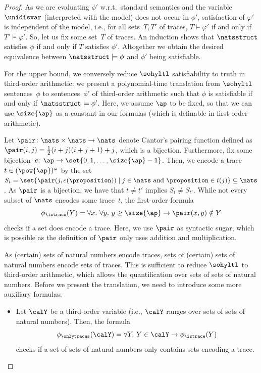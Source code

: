 \begin{proof}
As we are evaluating $\phi'$ w.r.t.\ standard semantics and the variable~$\unidisvar$ (interpreted with the model) does not occur in $\phi'$, satisfaction of $\varphi'$ is independent of the model, i.e., for all sets~$T,T'$ of traces, $T \models \varphi'$ if and only if $T' \models \varphi'$.
So, let us fix some set~$T$ of traces.
An induction shows that $\natsstruct$ satisfies $\phi$ if and only if $T$ satisfies $\phi'$.
Altogether we obtain the desired equivalence between $\natsstruct \models \phi$ and $\phi'$ being satisfiable.

For the upper bound, we conversely reduce $\sohyltl$ satisfiability to truth in third-order arithmetic: we present a polynomial-time translation from $\sohyltl$ sentences~$\phi$ 
 to sentences~$\phi'$ of third-order arithmetic such that  $\phi$ is satisfiable if and only if  $\natsstruct \models \phi'$. Here, we assume $\ap$ to be fixed, so that we can use $\size{\ap}$ as a constant in our formulas (which is definable in first-order arithmetic). 

Let $\pair \colon \nats\times\nats \rightarrow\nats$ denote Cantor's pairing function defined as $\pair(i,j) = \frac{1}{2}(i+j)(i+j+1) +j$, which is a bijection.
Furthermore, fix some bijection~$e \colon \ap \rightarrow\set{0,1,\ldots,\size{\ap}-1}$.
Then, we encode a trace~$t \in (\pow{\ap})^\omega$ by the set~$S_t =\set{\pair(j,e(\proposition)) \mid j \in \nats \text{ and } \proposition \in t(j)} \subseteq \nats$.
As $\pair$ is a bijection, we have that $t \neq t'$ implies $S_t \neq S_{t'}$.
While not every subset of $\nats$ encodes some trace~$t$, the first-order formula 
\[\phi_\istrace(Y) = \forall x.\ \forall y.\ y \ge \size{\ap} \rightarrow \pair(x,y) \notin Y \] checks if a set does encode a trace.
Here, we use $\pair$ as syntactic sugar, which is possible as the definition of $\pair$ only uses addition and multiplication.

As (certain) sets of natural numbers encode traces, sets of (certain) sets of natural numbers encode sets of traces. 
This is sufficient to reduce $\sohyltl$ to third-order arithmetic, which allows the quantification over sets of sets of natural numbers. 
Before we present the translation, we need to introduce some more auxiliary formulas:
\begin{itemize}
    \item Let $\calY$ be a third-order variable (i.e., $\calY$ ranges over sets of sets of natural numbers). Then, the formula
    \[\phi_\onlytraces(\calY) = \forall Y.\  Y  \in \calY \rightarrow \phi_\istrace(Y) \]
    checks if a set of sets of natural numbers only contains sets encoding a trace.


\end{itemize}
\end{proof}
